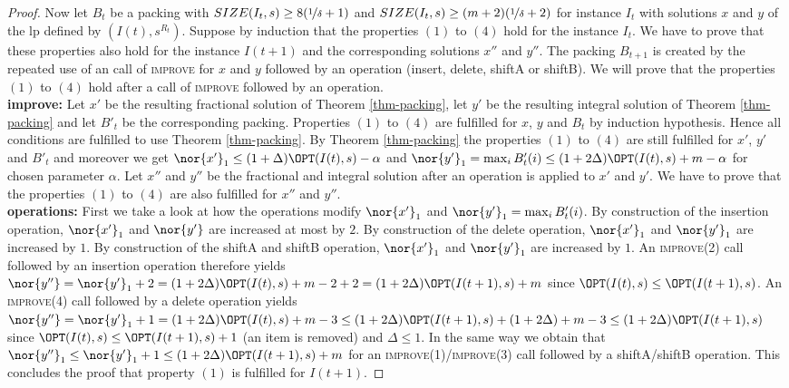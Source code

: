 \begin{proof}
    Now let $B_t$ be a packing with $SIZE(I_t,s) \geq 8 (\nicefrac{1}{\delta} +1)$ and $SIZE(I_t,s) \geq (m+2)(\nicefrac{1}{\delta} +2)$ for instance $I_t$ with solutions $x$ and $y$ of the \ac{lp} defined by $(I(t),s^{R_t})$. Suppose by induction that the properties $(1)$ to $(4)$ hold for the instance $I_t$. We have to prove that these properties also hold for the instance $I(t+1)$ and the corresponding solutions $x''$ and $y''$. The packing $B_{t+1}$ is created by the repeated use of an
	call of \textsc{improve} for $x$ and $y$ followed by an operation (insert, delete, shiftA or shiftB).
    We will prove that the properties $(1)$ to $(4)$ hold after a call of \textsc{improve} followed by an operation.
	\\{\bf improve:} Let $x'$ be the resulting fractional solution of Theorem \ref{thm-packing}, let $y'$ be the resulting integral solution of Theorem \ref{thm-packing} and let $B'_t$ be the corresponding packing. Properties $(1)$ to $(4)$ are fulfilled 
	for $x$, $y$ and $B_t$ by induction hypothesis. Hence all conditions are fulfilled to use Theorem \ref{thm-packing}. 
	By Theorem \ref{thm-packing} the properties $(1)$ to $(4)$ are still fulfilled for $x'$, $y'$ and $B'_t$ and moreover we get
	$\nor{x'}_1 \leq (1+ \Delta) \OPT(I(t),s)- \alpha$ and $\nor{y'}_1 = \max_i B'_t (i) \leq (1+ 2 \Delta) \OPT(I(t),s) + m - \alpha$ for chosen parameter $\alpha$. Let $x''$ and $y''$ be the fractional and integral solution after an operation is applied to $x'$ and $y'$. We have to prove that the properties $(1)$ to $(4)$ are also fulfilled for $x''$ and $y''$.
	\\{\bf operations:} First we take a look at how the operations modify $\nor{x'}_1$ and $\nor{y'}_1 =\max_i B'_t (i)$. By construction of the insertion operation, $\nor{x'}_1$ and $\nor{y'}$ are increased at most by $2$. By construction of the delete operation, $\nor{x'}_1$ and $\nor{y'}_1$ are increased by $1$. By construction of the shiftA and shiftB operation, $\nor{x'}_1$ and $\nor{y'}_1$ are increased by $1$.
	An \textsc{improve}(2) call followed by an insertion operation therefore yields $\nor{y''} = \nor{y'}_1 +2 = (1+ 2\Delta)\OPT(I(t),s) +m -2 +2 = (1+ 2\Delta)\OPT(I(t+1),s) +m$ since $\OPT(I(t),s) \leq \OPT(I(t+1),s)$.
    An \textsc{improve}(4) call followed by a delete operation yields $\nor{y''} = \nor{y'}_1 + 1 = (1+ 2\Delta)\OPT(I(t),s) + m -3 \leq (1+ 2\Delta)\OPT(I(t+1),s) + (1+2\Delta) +m - 3 \leq (1+ 2\Delta)\OPT(I(t+1),s)$ since $\OPT(I(t),s) \leq \OPT(I(t+1),s) +1$ (an item is removed) and $\Delta \leq 1$. In the same way we obtain that $\nor{y''}_1 \leq \nor{y'}_1 +1 \leq (1+ 2\Delta)\OPT(I(t+1),s) +m$ for an \textsc{improve}(1)/\textsc{improve}(3) call followed by a shiftA/shiftB operation. This concludes the proof that property $(1)$ is fulfilled for $I(t+1)$.

\end{proof}
